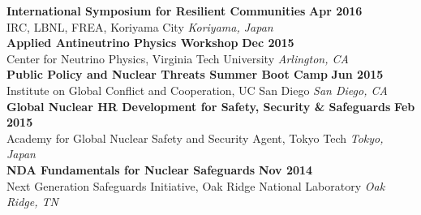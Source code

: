 {\bf International Symposium for Resilient Communities} \hfill {\bf Apr 2016}\\
{\small{IRC, LBNL, FREA, Koriyama City}} \hfill {\sl Koriyama, Japan}\\[-3.5ex]

{\bf Applied Antineutrino Physics Workshop} \hfill {\bf Dec 2015}\\
{\small{Center for Neutrino Physics, Virginia Tech University}} \hfill {\sl Arlington, CA}\\[-3.5ex]

{\bf Public Policy and Nuclear Threats Summer Boot Camp} \hfill {\bf Jun 2015}\\
{\small{Institute on Global Conflict and Cooperation, UC San Diego}} \hfill {\sl San Diego, CA}\\[-3.5ex]

{\bf Global Nuclear HR Development for Safety, Security \& Safeguards} \hfill {\bf Feb 2015}\\
{\small{Academy for Global Nuclear Safety and Security Agent, Tokyo Tech}}  \hfill {\sl Tokyo, Japan}\\[-3.5ex]

{\bf NDA Fundamentals for Nuclear Safeguards}   \hfill {\bf Nov 2014}\\
{\small{Next Generation Safeguards Initiative, Oak Ridge National Laboratory}} \hfill  {\sl Oak Ridge, TN}

%
